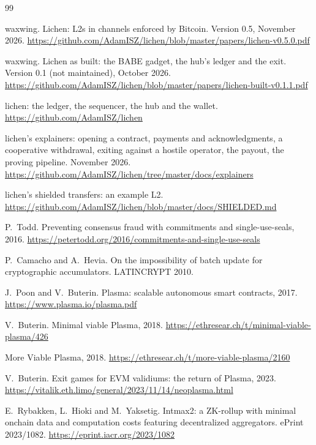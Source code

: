 \documentclass[11pt]{article}
\begin{document}
\begin{thebibliography}{99}

 waxwing. Lichen: L2s in channels enforced by Bitcoin. Version 0.5, November 2026. \url{https://github.com/AdamISZ/lichen/blob/master/papers/lichen-v0.5.0.pdf}

 waxwing. Lichen as built: the BABE gadget, the hub's ledger and the exit. Version 0.1 (not maintained), October 2026. \url{https://github.com/AdamISZ/lichen/blob/master/papers/lichen-built-v0.1.1.pdf}

 lichen: the ledger, the sequencer, the hub and the wallet. \url{https://github.com/AdamISZ/lichen}

 lichen's explainers: opening a contract, payments and acknowledgments, a cooperative withdrawal, exiting against a hostile operator, the payout, the proving pipeline. November 2026. \url{https://github.com/AdamISZ/lichen/tree/master/docs/explainers}

 lichen's shielded transfers: an example L2. \url{https://github.com/AdamISZ/lichen/blob/master/docs/SHIELDED.md}

 P.~Todd. Preventing consensus fraud with commitments and single-use-seals, 2016. \url{https://petertodd.org/2016/commitments-and-single-use-seals}

 P.~Camacho and A.~Hevia. On the impossibility of batch update for cryptographic accumulators. LATINCRYPT 2010.

 J.~Poon and V.~Buterin. Plasma: scalable autonomous smart contracts, 2017. \url{https://www.plasma.io/plasma.pdf}

 V.~Buterin. Minimal viable Plasma, 2018. \url{https://ethresear.ch/t/minimal-viable-plasma/426}

 More Viable Plasma, 2018. \url{https://ethresear.ch/t/more-viable-plasma/2160}

 V.~Buterin. Exit games for EVM validiums: the return of Plasma, 2023. \url{https://vitalik.eth.limo/general/2023/11/14/neoplasma.html}

 E.~Rybakken, L.~Hioki and M.~Yaksetig. Intmax2: a ZK-rollup with minimal onchain data and computation costs featuring decentralized aggregators. ePrint 2023/1082. \url{https://eprint.iacr.org/2023/1082}

\end{thebibliography}
\end{document}
